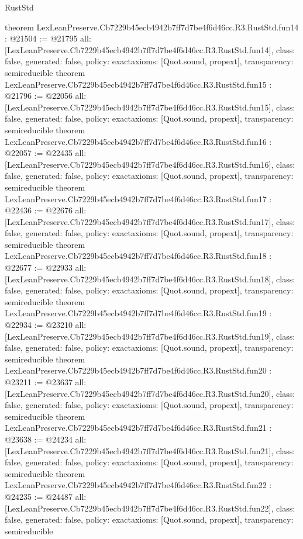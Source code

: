 \begin{lexlean}{RustStd}
\begin{coremodule}
{}
theorem LexLeanPreserve.Cb7229b45ecb4942b7ff7d7be4f6d46cc.R3.RustStd.fun14 : @21504 := @21795 {
  all: [LexLeanPreserve.Cb7229b45ecb4942b7ff7d7be4f6d46cc.R3.RustStd.fun14],
  class: false,
  generated: false,
  policy: exact{axioms: [Quot.sound, propext]},
  transparency: semireducible
}
theorem LexLeanPreserve.Cb7229b45ecb4942b7ff7d7be4f6d46cc.R3.RustStd.fun15 : @21796 := @22056 {
  all: [LexLeanPreserve.Cb7229b45ecb4942b7ff7d7be4f6d46cc.R3.RustStd.fun15],
  class: false,
  generated: false,
  policy: exact{axioms: [Quot.sound, propext]},
  transparency: semireducible
}
theorem LexLeanPreserve.Cb7229b45ecb4942b7ff7d7be4f6d46cc.R3.RustStd.fun16 : @22057 := @22435 {
  all: [LexLeanPreserve.Cb7229b45ecb4942b7ff7d7be4f6d46cc.R3.RustStd.fun16],
  class: false,
  generated: false,
  policy: exact{axioms: [Quot.sound, propext]},
  transparency: semireducible
}
theorem LexLeanPreserve.Cb7229b45ecb4942b7ff7d7be4f6d46cc.R3.RustStd.fun17 : @22436 := @22676 {
  all: [LexLeanPreserve.Cb7229b45ecb4942b7ff7d7be4f6d46cc.R3.RustStd.fun17],
  class: false,
  generated: false,
  policy: exact{axioms: [Quot.sound, propext]},
  transparency: semireducible
}
theorem LexLeanPreserve.Cb7229b45ecb4942b7ff7d7be4f6d46cc.R3.RustStd.fun18 : @22677 := @22933 {
  all: [LexLeanPreserve.Cb7229b45ecb4942b7ff7d7be4f6d46cc.R3.RustStd.fun18],
  class: false,
  generated: false,
  policy: exact{axioms: [Quot.sound, propext]},
  transparency: semireducible
}
theorem LexLeanPreserve.Cb7229b45ecb4942b7ff7d7be4f6d46cc.R3.RustStd.fun19 : @22934 := @23210 {
  all: [LexLeanPreserve.Cb7229b45ecb4942b7ff7d7be4f6d46cc.R3.RustStd.fun19],
  class: false,
  generated: false,
  policy: exact{axioms: [Quot.sound, propext]},
  transparency: semireducible
}
theorem LexLeanPreserve.Cb7229b45ecb4942b7ff7d7be4f6d46cc.R3.RustStd.fun20 : @23211 := @23637 {
  all: [LexLeanPreserve.Cb7229b45ecb4942b7ff7d7be4f6d46cc.R3.RustStd.fun20],
  class: false,
  generated: false,
  policy: exact{axioms: [Quot.sound, propext]},
  transparency: semireducible
}
theorem LexLeanPreserve.Cb7229b45ecb4942b7ff7d7be4f6d46cc.R3.RustStd.fun21 : @23638 := @24234 {
  all: [LexLeanPreserve.Cb7229b45ecb4942b7ff7d7be4f6d46cc.R3.RustStd.fun21],
  class: false,
  generated: false,
  policy: exact{axioms: [Quot.sound, propext]},
  transparency: semireducible
}
theorem LexLeanPreserve.Cb7229b45ecb4942b7ff7d7be4f6d46cc.R3.RustStd.fun22 : @24235 := @24487 {
  all: [LexLeanPreserve.Cb7229b45ecb4942b7ff7d7be4f6d46cc.R3.RustStd.fun22],
  class: false,
  generated: false,
  policy: exact{axioms: [Quot.sound, propext]},
  transparency: semireducible
}
\end{coremodule}
\end{lexlean}
